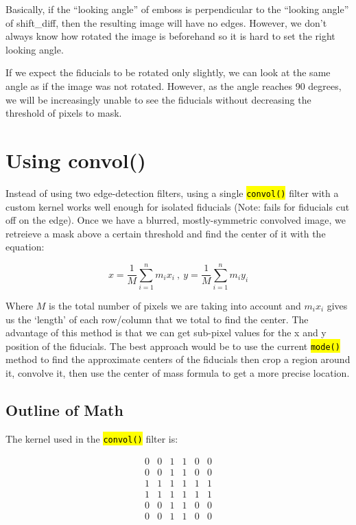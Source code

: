 \documentclass[10pt]{article}
\begin{document}
    Basically, if the ``looking angle'' of emboss is perpendicular to the ``looking angle'' of shift\_diff, then the resulting image will have no edges. However, we don't always know how rotated the image is beforehand so it is hard to set the right looking angle. 


    If we expect the fiducials to be rotated only slightly, we can look at the same angle as if the image was not rotated. However, as the angle reaches 90 degrees, we will be increasingly unable to see the fiducials without decreasing the threshold of pixels to mask.


\section{Using convol()} %
\label{sec:using_convol}
    Instead of using two edge-detection filters, using a single \hl{\texttt{convol()}} filter with a custom kernel works well enough for isolated fiducials (Note: fails for fiducials cut off on the edge). Once we have a blurred, mostly-symmetric convolved image, we retreieve a mask above a certain threshold and find the center of it with the equation:

    \begin{equation}
        x = \frac{1}{M}\sum_{i=1}^{n}m_ix_i~,~y = \frac{1}{M}\sum_{i=1}^{n}m_iy_i
    \end{equation}

    Where $M$ is the total number of pixels we are taking into account and $m_ix_i$ gives us the `length' of each row/column that we total to find the center. The advantage of this method is that we can get sub-pixel values for the x and y position of the fiducials. The best approach would be to use the current \hl{\texttt{mode()}} method to find the approximate centers of the fiducials then crop a region around it, convolve it, then use the center of mass formula to get a more precise location.

\subsection{Outline of Math} %
\label{sub:outline_of_math}
    The kernel used in the \hl{\texttt{convol()}} filter is:

    \[ \begin{array}{cccccc}
    0 & 0 & 1 & 1 & 0 & 0 \\
    0 & 0 & 1 & 1 & 0 & 0 \\
    1 & 1 & 1 & 1 & 1 & 1 \\
    1 & 1 & 1 & 1 & 1 & 1 \\
    0 & 0 & 1 & 1 & 0 & 0 \\
    0 & 0 & 1 & 1 & 0 & 0 \end{array}\] 
\end{document}
